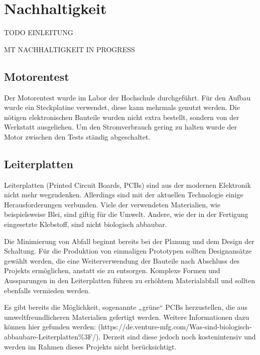 \section{Nachhaltigkeit}
\label{section:Nachhaltigkeit}

TODO EINLEITUNG 


MT NACHHALTIGKEIT IN PROGRESS


\subsection{Motorentest}

Der Motorentest wurde im Labor der Hochschule durchgeführt. Für den Aufbau wurde ein Steckplatine verwendet, diese kann mehrmals genutzt werden. Die nötigen elektronischen Bauteile wurden nicht extra bestellt, sondern von der Werkstatt ausgeliehen. Um den Stromverbrauch gering zu halten wurde der Motor zwischen den Tests ständig abgeschaltet. 

\subsection{Leiterplatten}

Leiterplatten (Printed Circuit Boards, PCBs) sind aus der modernen Elektronik nicht mehr wegzudenken. Allerdings sind mit der aktuellen Technologie einige Herausforderungen verbunden. Viele der verwendeten Materialien, wie beispielsweise Blei, sind giftig für die Umwelt. Andere, wie der in der Fertigung eingesetzte Klebstoff, sind nicht biologisch abbaubar.

Die Minimierung von Abfall beginnt bereits bei der Planung und dem Design der Schaltung. Für die Produktion von einmaligen Prototypen sollten Designansätze gewählt werden, die eine Weiterverwendung der Bauteile nach Abschluss des Projekts ermöglichen, anstatt sie zu entsorgen. Komplexe Formen und Aussparungen in den Leiterplatten führen zu erhöhtem Materialabfall und sollten ebenfalls vermieden werden.

Es gibt bereits die Möglichkeit, sogenannte „grüne“ PCBs herzustellen, die aus umweltfreundlicheren Materialien gefertigt werden. Weitere Informationen dazu können hier gefunden werden: (https://de.venture-mfg.com/Was-sind-biologisch-abbaubare-Leiterplatten\%3F/). Derzeit sind diese jedoch noch kostenintensiv und werden im Rahmen dieses Projekts nicht berücksichtigt.

